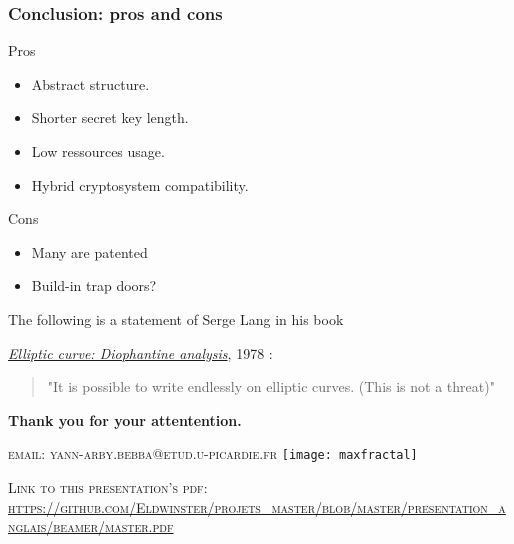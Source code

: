 \begin{frame}[t]
    \frametitle{Conclusion: pros and cons}
    Pros
    \begin{itemize}
        \item Abstract structure.
        \item Shorter secret key length.
        \item Low ressources usage.
        \item Hybrid cryptosystem compatibility.
    \end{itemize}

    Cons
    \begin{itemize}
        \item Many are patented
        \item Build-in trap doors? \cite{noauthor_how_2014} \cite{goodin_we_2013}
    \end{itemize}

    \begin{center}
    The following is a statement of Serge Lang in his book

    \textsl{\underline{Elliptic curve:
    Diophantine analysis}}, 1978 \cite{lang_auth_elliptic_1978}: 
    \begin{quote}
       "It is possible to write endlessly on elliptic curves. (This is not a threat)"
    \end{quote}
    \end{center}
\end{frame}

\begin{frame}[plain]
    \begin{center}
    {\huge\bfseries Thank you for your attentention.}

    \textsc{\Large email: yann-arby.bebba@etud.u-picardie.fr}
    \texttt{[image: maxfractal]}

    \textsc{\Large Link to this presentation's pdf:}
    \textsc{\Large
        \url{https://github.com/Eldwinster/projets_master/blob/master/presentation_anglais/beamer/master.pdf}}
    \end{center}
\end{frame}
